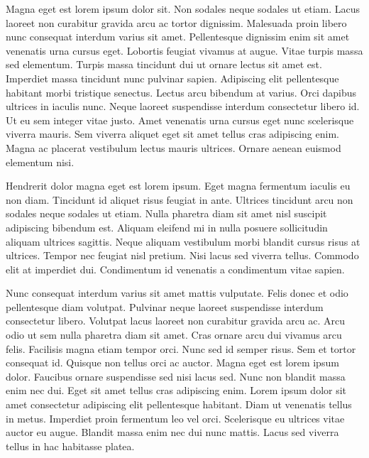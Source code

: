 \documentclass[11pt,a4paper]{article}
\begin{document}
Magna eget est lorem ipsum dolor sit. Non sodales neque sodales ut etiam. Lacus laoreet non curabitur gravida arcu ac tortor dignissim. Malesuada proin libero nunc consequat interdum varius sit amet. Pellentesque dignissim enim sit amet venenatis urna cursus eget. Lobortis feugiat vivamus at augue. Vitae turpis massa sed elementum. Turpis massa tincidunt dui ut ornare lectus sit amet est. Imperdiet massa tincidunt nunc pulvinar sapien. Adipiscing elit pellentesque habitant morbi tristique senectus. Lectus arcu bibendum at varius. Orci dapibus ultrices in iaculis nunc. Neque laoreet suspendisse interdum consectetur libero id. Ut eu sem integer vitae justo. Amet venenatis urna cursus eget nunc scelerisque viverra mauris. Sem viverra aliquet eget sit amet tellus cras adipiscing enim. Magna ac placerat vestibulum lectus mauris ultrices. Ornare aenean euismod elementum nisi.

Hendrerit dolor magna eget est lorem ipsum. Eget magna fermentum iaculis eu non diam. Tincidunt id aliquet risus feugiat in ante. Ultrices tincidunt arcu non sodales neque sodales ut etiam. Nulla pharetra diam sit amet nisl suscipit adipiscing bibendum est. Aliquam eleifend mi in nulla posuere sollicitudin aliquam ultrices sagittis. Neque aliquam vestibulum morbi blandit cursus risus at ultrices. Tempor nec feugiat nisl pretium. Nisi lacus sed viverra tellus. Commodo elit at imperdiet dui. Condimentum id venenatis a condimentum vitae sapien.

Nunc consequat interdum varius sit amet mattis vulputate. Felis donec et odio pellentesque diam volutpat. Pulvinar neque laoreet suspendisse interdum consectetur libero. Volutpat lacus laoreet non curabitur gravida arcu ac. Arcu odio ut sem nulla pharetra diam sit amet. Cras ornare arcu dui vivamus arcu felis. Facilisis magna etiam tempor orci. Nunc sed id semper risus. Sem et tortor consequat id. Quisque non tellus orci ac auctor. Magna eget est lorem ipsum dolor. Faucibus ornare suspendisse sed nisi lacus sed. Nunc non blandit massa enim nec dui. Eget sit amet tellus cras adipiscing enim. Lorem ipsum dolor sit amet consectetur adipiscing elit pellentesque habitant. Diam ut venenatis tellus in metus. Imperdiet proin fermentum leo vel orci. Scelerisque eu ultrices vitae auctor eu augue. Blandit massa enim nec dui nunc mattis. Lacus sed viverra tellus in hac habitasse platea.
\end{document}
